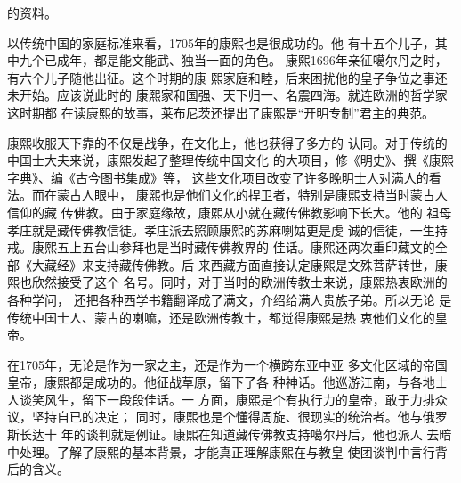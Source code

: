 的资料。%
\par
以传统中国的家庭标准来看，1705年的康熙也是很成功的。他%
有十五个儿子，其中九个已成年，都是能文能武、独当一面的角色。%
康熙1696年亲征噶尔丹之时，有六个儿子随他出征。这个时期的康%
熙家庭和睦，后来困扰他的皇子争位之事还未开始。应该说此时的%
康熙家和国强、天下归一、名震四海。就连欧洲的哲学家这时期都%
在读康熙的故事，莱布尼茨还提出了康熙是“开明专制”君主的典范。%
\par
康熙收服天下靠的不仅是战争，在文化上，他也获得了多方的%
认同。对于传统的中国士大夫来说，康熙发起了整理传统中国文化%
的大项目，修《明史》、撰《康熙字典》、编《古今图书集成》等，%
这些文化项目改变了许多晚明士人对满人的看法。而在蒙古人眼中，%
康熙也是他们文化的捍卫者，特别是康熙支持当时蒙古人信仰的藏%
传佛教。由于家庭缘故，康熙从小就在藏传佛教影响下长大。他的%
祖母孝庄就是藏传佛教信徒。孝庄派去照顾康熙的苏麻喇姑更是虔%
诚的信徒，一生持戒。康熙五上五台山参拜也是当时藏传佛教界的%
佳话。康熙还两次重印藏文的全部《大藏经》来支持藏传佛教。后%
来西藏方面直接认定康熙是文殊菩萨转世，康熙也欣然接受了这个%
名号。同时，对于当时的欧洲传教士来说，康熙热衷欧洲的各种学问，%
还把各种西学书籍翻译成了满文，介绍给满人贵族子弟。所以无论%
是传统中国士人、蒙古的喇嘛，还是欧洲传教士，都觉得康熙是热%
衷他们文化的皇帝。%
\par
在1705年，无论是作为一家之主，还是作为一个横跨东亚中亚%
多文化区域的帝国皇帝，康熙都是成功的。他征战草原，留下了各%
种神话。他巡游江南，与各地士人谈笑风生，留下一段段佳话。一%
方面，康熙是个有执行力的皇帝，敢于力排众议，坚持自已的决定；%
同时，康熙也是个懂得周旋、很现实的统治者。他与俄罗斯长达十%
年的谈判就是例证。康熙在知道藏传佛教支持噶尔丹后，他也派人%
去暗中处理。了解了康熙的基本背景，才能真正理解康熙在与教皇%
使团谈判中言行背后的含义。%
